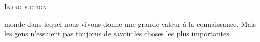 
\newpage

\begin{center}
\scshape\Huge\textls[-35] Introduction
\end{center}


 monde dans lequel nous vivons donne une grande valeur à la
 connaissance. Mais les gens n'essaient pas toujorus de savoir les choses les
 plus importantes.




